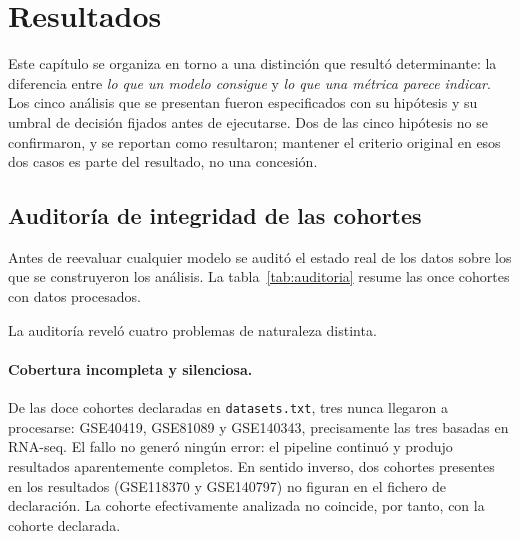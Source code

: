 
\section{Resultados}
\label{cap:resultados}

Este capítulo se organiza en torno a una distinción que resultó determinante:
la diferencia entre \emph{lo que un modelo consigue} y \emph{lo que una métrica
parece indicar}. Los cinco análisis que se presentan fueron especificados con su
hipótesis y su umbral de decisión fijados antes de ejecutarse. Dos de las cinco
hipótesis no se confirmaron, y se reportan como resultaron; mantener el criterio
original en esos dos casos es parte del resultado, no una concesión.

\subsection{Auditoría de integridad de las cohortes}
\label{sec:auditoria}

Antes de reevaluar cualquier modelo se auditó el estado real de los datos sobre
los que se construyeron los análisis. La tabla~\ref{tab:auditoria} resume las
once cohortes con datos procesados.



La auditoría reveló cuatro problemas de naturaleza distinta.

\paragraph{Cobertura incompleta y silenciosa.} De las doce cohortes declaradas
en \texttt{datasets.txt}, tres nunca llegaron a procesarse: GSE40419, GSE81089 y
GSE140343, precisamente las tres basadas en RNA-seq. El fallo no generó ningún
error: el pipeline continuó y produjo resultados aparentemente completos. En
sentido inverso, dos cohortes presentes en los resultados (GSE118370 y
GSE140797) no figuran en el fichero de declaración. La cohorte efectivamente
analizada no coincide, por tanto, con la cohorte declarada.

